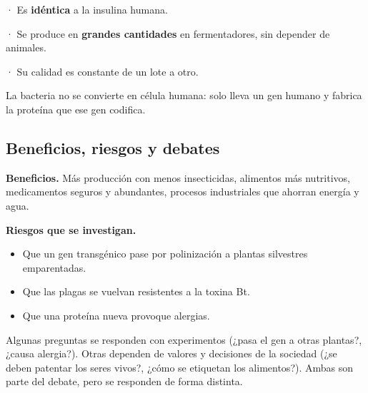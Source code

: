   
\begin{clave}[{Ventajas}] · Es \textbf{idéntica} a la insulina humana.\par · Se produce en \textbf{grandes cantidades} en fermentadores, sin depender de animales.\par · Su calidad es constante de un lote a otro.\end{clave}
 
\begin{clave}[{Recuerda}] La bacteria no se convierte en célula humana: solo lleva un gen humano y fabrica la proteína que ese gen codifica.\end{clave}
\subsection{Beneficios, riesgos y debates}
\textbf{Beneficios.} Más producción con menos insecticidas, alimentos más nutritivos, medicamentos seguros y abundantes, procesos industriales que ahorran energía y agua.

 

\textbf{Riesgos que se investigan.}

 
\begin{itemize}
  \item Que un gen transgénico pase por polinización a plantas silvestres emparentadas.
  \item Que las plagas se vuelvan resistentes a la toxina Bt.
  \item Que una proteína nueva provoque alergias.
\end{itemize}
  
\begin{clave} Algunas preguntas se responden con experimentos (¿pasa el gen a otras plantas?, ¿causa alergia?). Otras dependen de valores y decisiones de la sociedad (¿se deben patentar los seres vivos?, ¿cómo se etiquetan los alimentos?). Ambas son parte del debate, pero se responden de forma distinta.\end{clave}
